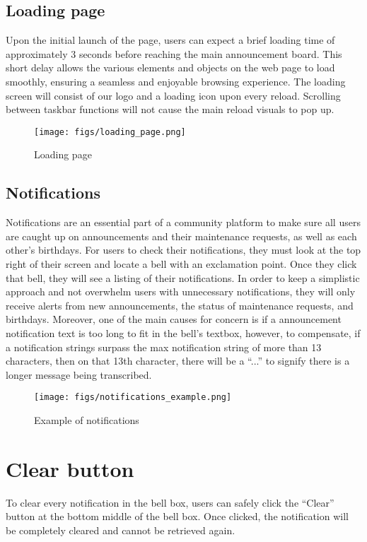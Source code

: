 \documentclass[conference]{IEEEtran}
\begin{document}
\subsection{Loading page}
Upon the initial launch of the page, users can expect a brief loading time of approximately 3 seconds before reaching the main announcement board. This short delay allows the various elements and objects on the web page to load smoothly, ensuring a seamless and enjoyable browsing experience. The loading screen will consist of our logo and a loading icon upon every reload. Scrolling between taskbar functions will not cause the main reload visuals to pop up.
\begin{figure}[H]
\centering
\texttt{[image: figs/loading\_page.png]}
\caption{Loading page}
\label{fig:Loading page}
\end{figure}
\subsection{Notifications}
Notifications are an essential part of a community platform to make sure all users are caught up on announcements and their maintenance requests, as well as each other’s  birthdays. For users to check their notifications, they must look at the top right of their screen and locate a bell with an exclamation point. Once they click that bell, they will see a listing of their notifications. In order to keep a simplistic approach and not overwhelm users with unnecessary notifications, they will only receive alerts from new announcements, the status of maintenance requests, and birthdays. Moreover, one of the main causes for concern is if a announcement notification text is too long to fit in the bell’s textbox, however, to compensate, if a notification strings surpass the max notification string of  more than 13 characters, then on that 13th character, there will be a “...” to signify there is a longer message being transcribed. 
\begin{figure}[H]
\centering
\texttt{[image: figs/notifications\_example.png]}
\caption{Example of notifications}
\label{fig:Example of notifications}
\end{figure}
\section*{Clear button}
To clear every notification in the bell box, users can safely click the “Clear” button at the bottom middle of the bell box. Once clicked, the notification will be completely cleared and  cannot be retrieved again.
\end{document}
